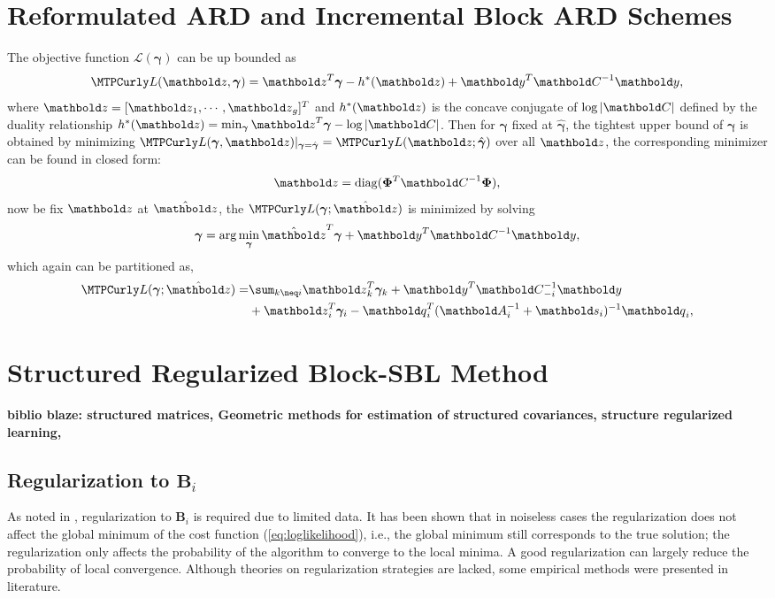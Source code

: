 \section{Reformulated ARD and Incremental Block ARD Schemes}
The objective function $\mathcal{L}(\bm{\gamma})$ can be up bounded as
\begin{equation}
\mathcal{L}(\ve{z},\bm{\gamma}) = \ve{z}^T\bm{\gamma} - h^*(\ve{z}) + \ve{y}^T\ve{C}^{-1}\ve{y},
\end{equation}
where $\ve{z}=[\ve{z}_1,\cdots,\ve{z}_g]^T$ and $h^*(\ve{z})$ is the concave conjugate of 
$\log\abs{\ve{C}}$ defined by the duality relationship 
$h^*(\ve{z})=\min_{\bm{\gamma}}\ve{z}^T\bm{\gamma} - \log\abs{\ve{C}}$.
Then for $\bm{\gamma}$ fixed at $\hat{\bm{\gamma}}$, the tightest upper bound of 
$\mathcal{\bm{\gamma}}$ is obtained by minimizing 
$\mathcal{L}(\bm{\gamma},\ve{z})|_{\bm{\gamma}=\hat{\bm{\gamma}}}=\mathcal{L}(\ve{z};\hat{\bm{\gamma}})$
over all $\ve{z}$, the corresponding minimizer can be found in closed form:
\begin{equation}
\ve{z} = \mathrm{diag}(\bm{\Phi}^T\ve{C}^{-1}\bm{\Phi}),
\end{equation}
now be fix $\ve{z}$ at $\hat{\ve{z}}$, the $\mathcal{L}(\bm{\gamma};\hat{\ve{z}})$ is minimized 
by solving 
\begin{equation}
\bm{\gamma} = \arg\min_{\bm{\gamma}} \hat{\ve{z}}^T\bm{\gamma} + \ve{y}^T\ve{C}^{-1}\ve{y},
\end{equation}
which again can be partitioned as,
\begin{align}
\mathcal{L}(\bm{\gamma};\hat{\ve{z}}) =& \sum_{k\neq i}\ve{z}_k^T\bm{\gamma}_k + \ve{y}^T\ve{C}_{-i}^{-1}\ve{y} \\
& +\ve{z}_i^T\bm{\gamma}_i - \ve{q}_i^T(\ve{A}_i^{-1} + \ve{s}_i)^{-1}\ve{q}_i,
\end{align}

\section{Structured Regularized Block-SBL Method}
{\bf biblio blaze: structured matrices, Geometric methods for estimation of 
structured covariances, structure regularized learning, }

\subsection{Regularization to $\mathbf{B}_i$}

As noted in \cite{Zhang2012a},  regularization to $\mathbf{B}_i$ is required due to limited data. It has been shown \cite{Zhang2011} that in noiseless cases the regularization does not affect the global minimum of the cost function (\ref{eq:loglikelihood}), i.e., the global minimum still corresponds to the true solution; the regularization only affects the probability of the algorithm to converge to the local minima. A good regularization can largely reduce the probability of local convergence. Although theories on regularization strategies are lacked, some empirical methods \cite{Zhang2011,Zhang2012a} were presented in literature.

